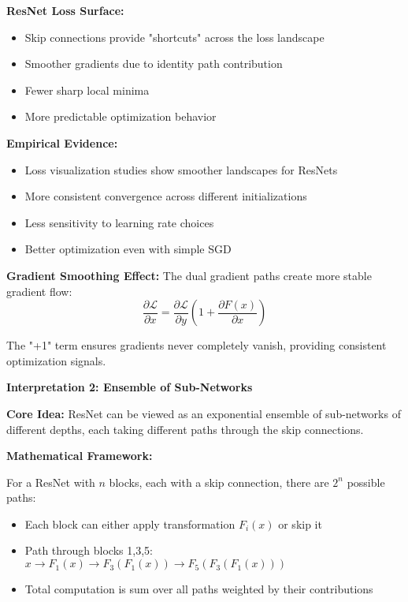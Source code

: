 \documentclass[12pt]{article}
\begin{document}
\begin{enumerate}[(a)]
{    \textbf{ResNet Loss Surface:}
    \begin{itemize}
        \item Skip connections provide "shortcuts" across the loss landscape
        \item Smoother gradients due to identity path contribution
        \item Fewer sharp local minima
        \item More predictable optimization behavior
    \end{itemize}
    
    \textbf{Empirical Evidence:}
    \begin{itemize}
        \item Loss visualization studies show smoother landscapes for ResNets
        \item More consistent convergence across different initializations
        \item Less sensitivity to learning rate choices
        \item Better optimization even with simple SGD
    \end{itemize}
    
    \textbf{Gradient Smoothing Effect:}
    The dual gradient paths create more stable gradient flow:
    $$\frac{\partial \mathcal{L}}{\partial x} = \frac{\partial \mathcal{L}}{\partial y}\left(1 + \frac{\partial F(x)}{\partial x}\right)$$
    
    The "+1" term ensures gradients never completely vanish, providing consistent optimization signals.
    
    \textbf{Interpretation 2: Ensemble of Sub-Networks}
    
    \textbf{Core Idea:}
    ResNet can be viewed as an exponential ensemble of sub-networks of different depths, each taking different paths through the skip connections.
    
    \textbf{Mathematical Framework:}
    
    For a ResNet with $n$ blocks, each with a skip connection, there are $2^n$ possible paths:
    \begin{itemize}
        \item Each block can either apply transformation $F_i(x)$ or skip it
        \item Path through blocks 1,3,5: $x \rightarrow F_1(x) \rightarrow F_3(F_1(x)) \rightarrow F_5(F_3(F_1(x)))$
        \item Total computation is sum over all paths weighted by their contributions
    \end{itemize}
    
}
\end{enumerate}
\end{document}
